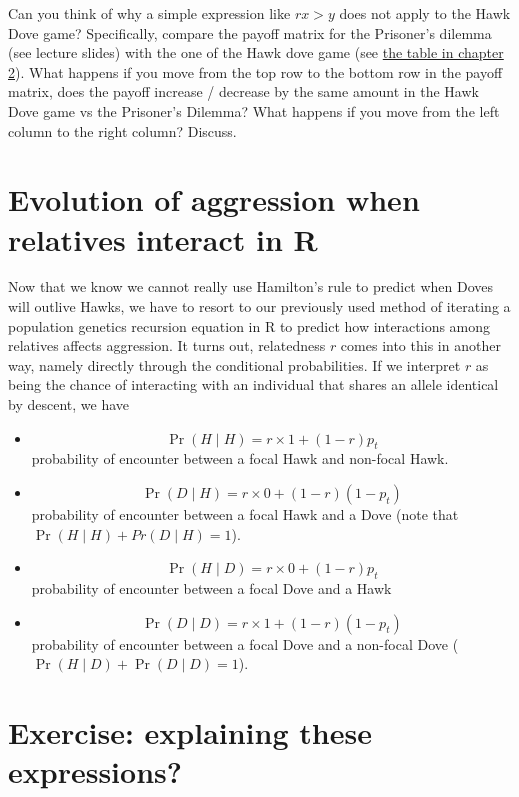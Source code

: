 \documentclass[
]{book}
\providecommand{\tightlist}{%
  \setlength{\itemsep}{0pt}\setlength{\parskip}{0pt}}
\begin{document}
Can you think of why a simple expression like \(r x > y\) does not apply to the Hawk Dove game? Specifically, compare the payoff matrix for the Prisoner's dilemma (see lecture slides) with the one of the Hawk dove game (see \protect\hyperlink{tab:payoffHD}{the table in chapter 2}). What happens if you move from the top row to the bottom row in the payoff matrix, does the payoff increase / decrease by the same amount in the Hawk Dove game vs the Prisoner's Dilemma? What happens if you move from the left column to the right column? Discuss.

\hypertarget{evolution-of-aggression-when-relatives-interact-in-r}{%
\section{Evolution of aggression when relatives interact in R}\label{evolution-of-aggression-when-relatives-interact-in-r}}

Now that we know we cannot really use Hamilton's rule to predict when Doves will outlive Hawks, we have to resort to our previously used method of iterating a population genetics recursion equation in R to predict how interactions among relatives affects aggression. It turns out, relatedness \(r\) comes into this in another way, namely directly through the conditional probabilities. If we interpret \(r\) as being the chance of interacting with an individual that shares an allele identical by descent, we have

\begin{itemize}
\tightlist
\item
  \[ \Pr(H \mid H) = r \times 1 + (1-r ) p_{t} \] probability of encounter between a focal Hawk and non-focal Hawk.
\item
  \[ \Pr(D \mid H) = r \times 0 + (1-r) (1-p_{t}) \] probability of encounter between a focal Hawk and a Dove (note that \(\Pr(H \mid H) + Pr(D \mid H) = 1\)).
\item
  \[ \Pr(H \mid D) = r \times 0 + (1-r) p_{t} \] probability of encounter between a focal Dove and a Hawk
\item
  \[ \Pr(D \mid D) = r \times 1 + (1- r) (1-p_{t} ) \] probability of encounter between a focal Dove and a non-focal Dove (\(\Pr(H \mid D) + \Pr(D \mid D) = 1\)).
\end{itemize}

\hypertarget{exercise-explaining-these-expressions}{%
\section{Exercise: explaining these expressions?}\label{exercise-explaining-these-expressions}}
\end{document}
